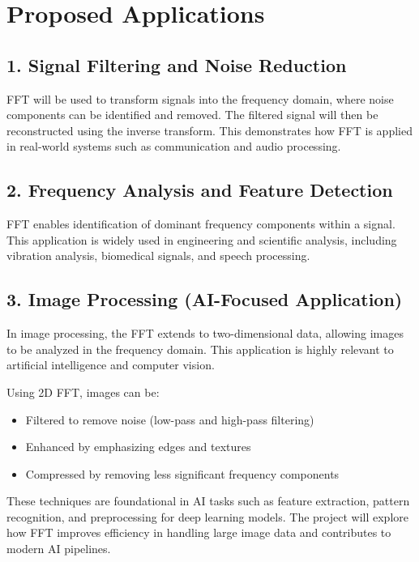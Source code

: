 \documentclass[12pt]{article}
\begin{document}
\pagebreak

\section*{Proposed Applications}

\subsection*{1. Signal Filtering and Noise Reduction}
FFT will be used to transform signals into the frequency domain, where noise components can be identified and removed. The filtered signal will then be reconstructed using the inverse transform. This demonstrates how FFT is applied in real-world systems such as communication and audio processing.

\subsection*{2. Frequency Analysis and Feature Detection}
FFT enables identification of dominant frequency components within a signal. This application is widely used in engineering and scientific analysis, including vibration analysis, biomedical signals, and speech processing.

\subsection*{3. Image Processing (AI-Focused Application)}
In image processing, the FFT extends to two-dimensional data, allowing images to be analyzed in the frequency domain. This application is highly relevant to artificial intelligence and computer vision.

Using 2D FFT, images can be:
\begin{itemize}
    \item Filtered to remove noise (low-pass and high-pass filtering)
    \item Enhanced by emphasizing edges and textures
    \item Compressed by removing less significant frequency components
\end{itemize}

These techniques are foundational in AI tasks such as feature extraction, pattern recognition, and preprocessing for deep learning models. The project will explore how FFT improves efficiency in handling large image data and contributes to modern AI pipelines.

\end{document}
